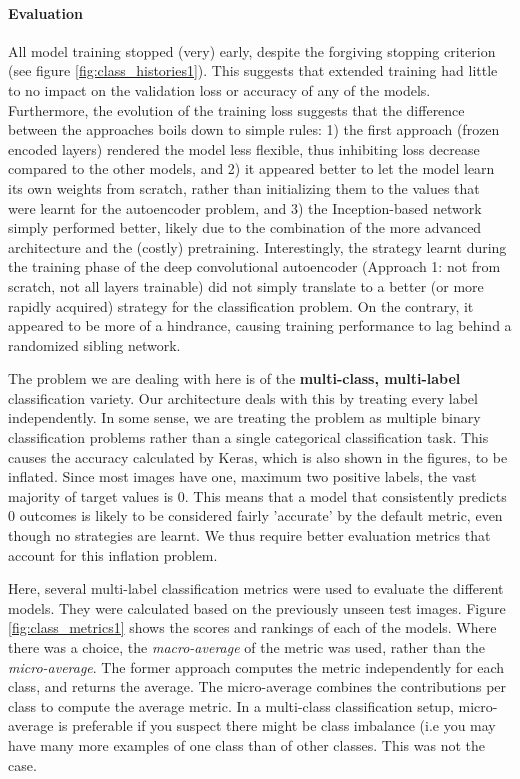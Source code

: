 \paragraph{Evaluation}
All model training stopped (very) early, despite the forgiving stopping criterion (see figure \ref{fig:class_histories1}). This suggests that extended training had little to no impact on the validation loss or accuracy of any of the models. Furthermore, the evolution of the training loss suggests that the difference between the approaches boils down to simple rules: 1) the first approach (frozen encoded layers) rendered the model less flexible, thus inhibiting loss decrease compared to the other models, and 2) it appeared better to let the model learn its own weights from scratch, rather than initializing them to the values that were learnt for the autoencoder problem, and 3) the Inception-based network simply performed better, likely due to the combination of the more advanced architecture and the (costly) pretraining. Interestingly, the strategy learnt during the training phase of the deep convolutional autoencoder (Approach 1: not from scratch, not all layers trainable) did not simply translate to a better (or more rapidly acquired) strategy for the classification problem. On the contrary, it appeared to be more of a hindrance, causing training performance to lag behind a randomized sibling network.

The problem we are dealing with here is of the \textbf{multi-class, multi-label} classification variety. Our architecture deals with this by treating every label independently. In some sense, we are treating the problem as multiple binary classification problems rather than a single categorical classification task. This causes the accuracy calculated by Keras, which is also shown in the figures, to be inflated. Since most images have one, maximum two positive labels, the vast majority of target values is 0. This means that a model that consistently predicts 0 outcomes is likely to be considered fairly 'accurate' by the default metric, even though no strategies are learnt. We thus require better evaluation metrics that account for this inflation problem.

Here, several multi-label classification metrics were used to evaluate the different models. They were calculated based on the previously unseen test images. Figure \ref{fig:class_metrics1} shows the scores and rankings of each of the models. Where there was a choice, the \textit{macro-average} of the metric was used, rather than the \textit{micro-average}. The former approach computes the metric independently for each class, and returns the average. The micro-average combines the contributions per class to compute the average metric.  In a multi-class classification setup, micro-average is preferable if you suspect there might be class imbalance (i.e you may have many more examples of one class than of other classes. This was not the case.

